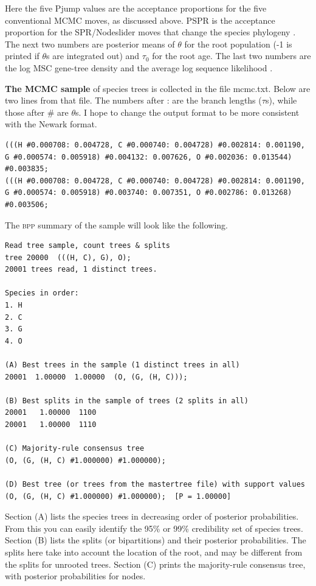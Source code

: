 \documentclass[a4paper]{book}
\numberwithin{equation}{section} \renewcommand{\baselinestretch}{0.55}
\begin{document}
Here the five Pjump values are the acceptance proportions for the five
conventional MCMC moves, as discussed above.  PSPR is the acceptance
proportion for the SPR/Nodeslider moves that change the species
phylogeny \cite{Rannala2017}.  The next two numbers are posterior
means of $\theta$ for the root population (-1 is printed if $\theta$s
are integrated out) and $\tau_0$ for the root age.  The last two
numbers are the log MSC gene-tree density \citep{Rannala2003} and the
average log sequence likelihood \cite{Felsenstein1981}.

\textbf{The MCMC sample} of species trees is collected in the file
mcmc.txt.  Below are two lines from that file.  The numbers after :
are the branch lengths ($\tau$s), while those after \# are $\theta$s.
I hope to change the output format to be more consistent with the
Newark format.

\begin{verbatim}
(((H #0.000708: 0.004728, C #0.000740: 0.004728) #0.002814: 0.001190, G #0.000574: 0.005918) #0.004132: 0.007626, O #0.002036: 0.013544) #0.003835;
(((H #0.000708: 0.004728, C #0.000740: 0.004728) #0.002814: 0.001190, G #0.000574: 0.005918) #0.003740: 0.007351, O #0.002786: 0.013268) #0.003506;
\end{verbatim}

The \textsc{bpp} summary of the sample will look like the following.
\begin{verbatim}
Read tree sample, count trees & splits
tree 20000  (((H, C), G), O);
20001 trees read, 1 distinct trees.

Species in order:
1. H
2. C
3. G
4. O

(A) Best trees in the sample (1 distinct trees in all)
20001  1.00000  1.00000  (O, (G, (H, C)));

(B) Best splits in the sample of trees (2 splits in all)
20001   1.00000  1100
20001   1.00000  1110

(C) Majority-rule consensus tree
(O, (G, (H, C) #1.000000) #1.000000);

(D) Best tree (or trees from the mastertree file) with support values
(O, (G, (H, C) #1.000000) #1.000000);  [P = 1.00000]
\end{verbatim}

Section (A) lists the species trees in decreasing order of posterior
probabilities.  From this you can easily identify the 95\% or 99\%
credibility set of species trees.  Section (B) lists the splits (or
bipartitions) and their posterior probabilities.  The splits here take
into account the location of the root, and may be different from the
splits for unrooted trees.  Section (C) prints the majority-rule
consensus tree, with posterior probabilities for nodes.
\end{document}
